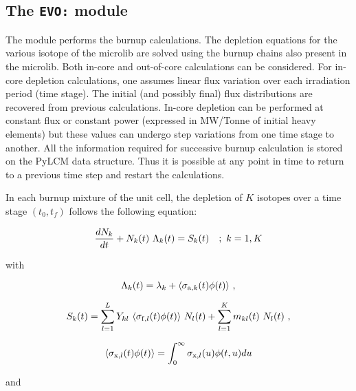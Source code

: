 \subsection{The {\tt EVO:} module}\label{sect:EVOData}

The  module performs the burnup calculations. The depletion equations
for the various isotope of the {\sc microlib} are solved using the burnup chains
also present in the {\sc microlib}. Both in-core and out-of-core calculations
can be considered. For in-core depletion calculations, one assumes linear flux variation
over each irradiation period (time stage). The initial (and possibly final) flux
distributions are recovered from previous  calculations. In-core depletion can
be performed at constant flux or constant power (expressed in MW/Tonne of initial heavy
elements) but these values can undergo step variations from one time stage to another.
All the information required for successive burnup calculation is stored on the PyLCM
 data structure. Thus it is possible at any point in time to return to a previous
time step and restart the calculations.

\vskip 0.2cm

In each burnup mixture of the unit cell, the depletion of $K$ isotopes over a time
stage $(t_0,t_f)$ follows the following equation:

\begin{equation}
{dN_k \over dt} + N_k(t) \ \Lambda_k(t)=S_k(t) \ \ \ ; \ {k=1,K}
\label{eq:depletion}
\end{equation}
 
\noindent with
 
\begin{equation}
\Lambda_k(t)= \lambda_k + \langle \sigma_{{\rm a},k}(t) \phi(t) \rangle \ ,
\end{equation}

\vskip 0.2cm

\begin{equation}
S_k(t)=\sum^L_{l=1} {Y_{kl} \ \langle \sigma_{{\rm f},l}(t) \phi(t) \rangle } \ N_l(t) +
\sum^K_{l=1} m_{kl}(t) \ {N_l(t)} \ ,
\end{equation}

\vskip 0.2cm

\begin{equation}
\langle \sigma_{{\rm x},l}(t) \phi(t) \rangle = \int_0^\infty {\sigma_{{\rm x},l}(u) \phi(t,u) du}
\end{equation}

\noindent and
 
